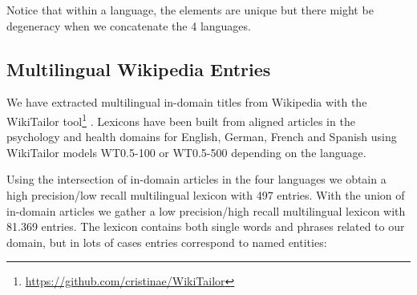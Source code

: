 \documentclass[a4paper,11pt]{article}
\begin{document}

Notice that within a language, the elements are unique but there might be degeneracy when we concatenate the 4 languages.

\subsection{Multilingual Wikipedia Entries}
\label{ss:wpLex}


We have extracted multilingual in-domain titles from Wikipedia with the WikiTailor tool\footnote{\url{https://github.com/cristinae/WikiTailor}}
 \cite{barronEtAl:2015}. 
Lexicons have been built from aligned articles in the psychology and health domains for English, German, French and Spanish using WikiTailor models WT0.5-100 or WT0.5-500 depending on the language.

Using the intersection of in-domain articles in the four languages we obtain a high precision/low recall multilingual lexicon with 497 entries. With the union of in-domain articles we gather a low precision/high recall multilingual lexicon with 81.369 entries. 
The lexicon contains both single words and phrases related to our domain, but in lots of cases entries correspond to named entities:
\end{document}
